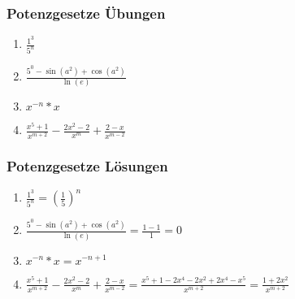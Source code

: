 \begin{frame}
    \frametitle{Potenzgesetze Übungen}
	\begin{enumerate}
		\vfill \item $\frac{1^3}{5^n}$
		\vfill \item $\frac{5^0- \sin(a^2) + \cos(a^2)}{\ln(e)}$
		\vfill \item $x^{-n} * x$
		\vfill \item $\frac{x^5 +1}{x^{m+2}} - \frac{2x^2-2}{x^m} + \frac{2-x}{x^{m-2}}$
	\end{enumerate}
\end{frame}

\begin{frame}
    \frametitle{Potenzgesetze Lösungen}
	\begin{enumerate}
		\vfill \item $\frac{1^3}{5^n} = (\frac{1}{5})^n$
		\vfill \item $\frac{5^0- \sin(a^2) + \cos(a^2)}{\ln(e)} = \frac{1-1}{1} = 0$
		\vfill \item $x^{-n} * x = x^{-n+1}$
		\vfill \item $\frac{x^5 +1}{x^{m+2}} - \frac{2x^2-2}{x^m} + \frac{2-x}{x^{m-2}} = \frac{x^5+1-2x^4-2x^2+2x^4-x^5}{x^{m+2}} = \frac{1+2x^2}{x^{m+2}}$
	\end{enumerate}
\end{frame}
